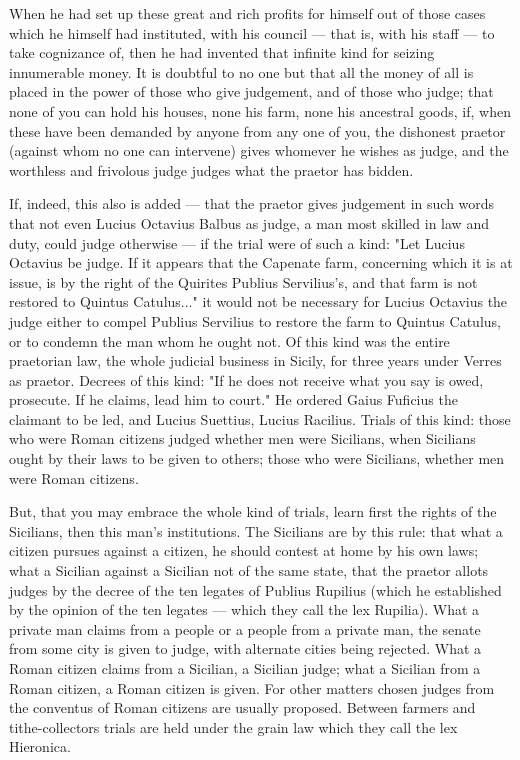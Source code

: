  When he had set up these great and rich profits for himself out of those cases which he himself had instituted, with his council --- that is, with his staff --- to take cognizance of, then he had invented that infinite kind for seizing innumerable money. It is doubtful to no one but that all the money of all is placed in the power of those who give judgement, and of those who judge; that none of you can hold his houses, none his farm, none his ancestral goods, if, when these have been demanded by anyone from any one of you, the dishonest praetor (against whom no one can intervene) gives whomever he wishes as judge, and the worthless and frivolous judge judges what the praetor has bidden.

 If, indeed, this also is added --- that the praetor gives judgement in such words that not even Lucius Octavius Balbus as judge, a man most skilled in law and duty, could judge otherwise --- if the trial were of such a kind: "Let Lucius Octavius be judge. If it appears that the Capenate farm, concerning which it is at issue, is by the right of the Quirites Publius Servilius's, and that farm is not restored to Quintus Catulus..." it would not be necessary for Lucius Octavius the judge either to compel Publius Servilius to restore the farm to Quintus Catulus, or to condemn the man whom he ought not. Of this kind was the entire praetorian law, the whole judicial business in Sicily, for three years under Verres as praetor. Decrees of this kind: "If he does not receive what you say is owed, prosecute. If he claims, lead him to court." He ordered Gaius Fuficius the claimant to be led, and Lucius Suettius, Lucius Racilius. Trials of this kind: those who were Roman citizens judged whether men were Sicilians, when Sicilians ought by their laws to be given to others; those who were Sicilians, whether men were Roman citizens.

 But, that you may embrace the whole kind of trials, learn first the rights of the Sicilians, then this man's institutions. The Sicilians are by this rule: that what a citizen pursues against a citizen, he should contest at home by his own laws; what a Sicilian against a Sicilian not of the same state, that the praetor allots judges by the decree of the ten legates of Publius Rupilius (which he established by the opinion of the ten legates --- which they call the lex Rupilia). What a private man claims from a people or a people from a private man, the senate from some city is given to judge, with alternate cities being rejected. What a Roman citizen claims from a Sicilian, a Sicilian judge; what a Sicilian from a Roman citizen, a Roman citizen is given. For other matters chosen judges from the conventus of Roman citizens are usually proposed. Between farmers and tithe-collectors trials are held under the grain law which they call the lex Hieronica.

